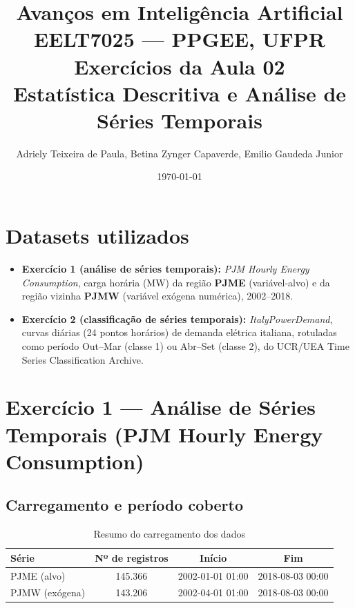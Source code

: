 \documentclass[12pt,a4paper]{article}
\title{
    \Large \textbf{Avanços em Inteligência Artificial} \\
    \large EELT7025 --- PPGEE, UFPR \\[0.3cm]
    \normalsize Exercícios da Aula 02 \\
    \normalsize Estatística Descritiva e Análise de Séries Temporais
}
\author{Adriely Teixeira de Paula, Betina Zynger Capaverde, Emilio Gaudeda Junior}
\date{\today}
\begin{document}
\maketitle
\tableofcontents
\newpage

\section*{Datasets utilizados}

\begin{itemize}
    \item \textbf{Exercício 1 (análise de séries temporais):} \emph{PJM Hourly Energy Consumption}, carga horária (MW) da região \textbf{PJME} (variável-alvo) e da região vizinha \textbf{PJMW} (variável exógena numérica), 2002--2018.
    \item \textbf{Exercício 2 (classificação de séries temporais):} \emph{ItalyPowerDemand}, curvas diárias (24 pontos horários) de demanda elétrica italiana, rotuladas como período Out--Mar (classe 1) ou Abr--Set (classe 2), do UCR/UEA Time Series Classification Archive.
\end{itemize}

\newpage
\section{Exercício 1 --- Análise de Séries Temporais (PJM Hourly Energy Consumption)}

\subsection{Carregamento e período coberto}

\begin{table}[H]
\centering
\caption{Resumo do carregamento dos dados}
\begin{tabular}{lccc}
\toprule
Série & Nº de registros & Início & Fim \\
\midrule
PJME (alvo)     & 145.366 & 2002-01-01 01:00 & 2018-08-03 00:00 \\
PJMW (exógena)  & 143.206 & 2002-04-01 01:00 & 2018-08-03 00:00 \\
\bottomrule
\end{tabular}
\end{table}
\end{document}
